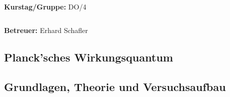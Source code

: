\documentclass[12pt,a4paper]{article}
\begin{document}
\begin{verbatim}


\end{verbatim}
			\begin{flushleft}
			\textbf{\Large{Kurstag/Gruppe:}} \Large{DO/4}
			\end{flushleft}

\begin{verbatim}

\end{verbatim}
			\begin{flushleft}
			\LARGE{\textbf{Betreuer:}}	\Large{Erhard Schafler}	
			\end{flushleft}

\pagebreak
\setlength{\columnsep}{20pt}
\begin{multicols}{2}




%			



\section{Planck'sches Wirkungsquantum}

\subsection{Grundlagen, Theorie und Versuchsaufbau}


\end{multicols}
\end{document}
